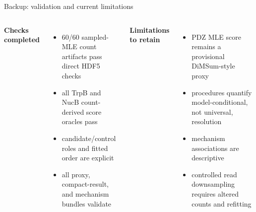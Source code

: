 \documentclass[aspectratio=169,11pt]{beamer}
\newcommand{\key}[1]{\textcolor{boxrule}{\bfseries #1}}
\newcommand{\tightitems}{\setlength{\itemsep}{0.35em}\setlength{\parskip}{0pt}}
\begin{document}
\begin{frame}{Backup: validation and current limitations}
  \begin{columns}[T,onlytextwidth]
      \key{Checks completed}
      \begin{itemize}\tightitems
        \item 60/60 sampled-MLE count artifacts pass direct HDF5 checks
        \item all TrpB and NucB count-derived score oracles pass
        \item candidate/control roles and fitted order are explicit
        \item all proxy, compact-result, and mechanism bundles validate
      \end{itemize}
      \key{Limitations to retain}
      \begin{itemize}\tightitems
        \item PDZ MLE score remains a provisional DiMSum-style proxy
        \item procedures quantify model-conditional, not universal, resolution
        \item mechanism associations are descriptive
        \item controlled read downsampling requires altered counts and refitting
      \end{itemize}
  \end{columns}
\end{frame}
\end{document}
